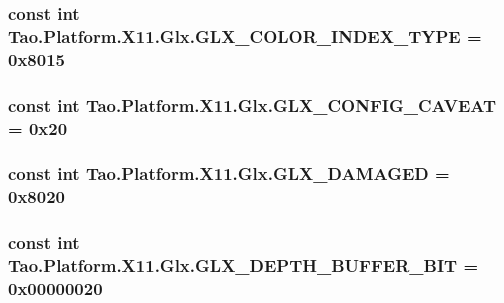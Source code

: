 \label{class_tao_1_1_platform_1_1_x11_1_1_glx_a056beffa48c29bc3c7fa561438a7958d}
\hypertarget{class_tao_1_1_platform_1_1_x11_1_1_glx_aca5ff459ff309805a054eb5af32d091c}{
\subsubsection[{GLX\_\-COLOR\_\-INDEX\_\-TYPE}]{\setlength{\rightskip}{0pt plus 5cm}const int {\bf Tao.Platform.X11.Glx.GLX\_\-COLOR\_\-INDEX\_\-TYPE} = 0x8015}}
\label{class_tao_1_1_platform_1_1_x11_1_1_glx_aca5ff459ff309805a054eb5af32d091c}
\hypertarget{class_tao_1_1_platform_1_1_x11_1_1_glx_ac819c74afaae71b2a3ac8b12ca407974}{
\subsubsection[{GLX\_\-CONFIG\_\-CAVEAT}]{\setlength{\rightskip}{0pt plus 5cm}const int {\bf Tao.Platform.X11.Glx.GLX\_\-CONFIG\_\-CAVEAT} = 0x20}}
\label{class_tao_1_1_platform_1_1_x11_1_1_glx_ac819c74afaae71b2a3ac8b12ca407974}
\hypertarget{class_tao_1_1_platform_1_1_x11_1_1_glx_a3fa5e550a34663b1153f8fbd643366d1}{
\subsubsection[{GLX\_\-DAMAGED}]{\setlength{\rightskip}{0pt plus 5cm}const int {\bf Tao.Platform.X11.Glx.GLX\_\-DAMAGED} = 0x8020}}
\label{class_tao_1_1_platform_1_1_x11_1_1_glx_a3fa5e550a34663b1153f8fbd643366d1}
\hypertarget{class_tao_1_1_platform_1_1_x11_1_1_glx_a2edb4c4f6cb3c8aaecba060d252374bb}{
\subsubsection[{GLX\_\-DEPTH\_\-BUFFER\_\-BIT}]{\setlength{\rightskip}{0pt plus 5cm}const int {\bf Tao.Platform.X11.Glx.GLX\_\-DEPTH\_\-BUFFER\_\-BIT} = 0x00000020}}
